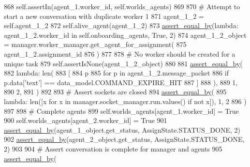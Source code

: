 \begin{DoxyCode}
868         self.assertIn(agent\_1.worker\_id, self.worlds\_agents)
869 
870         \textcolor{comment}{# Attempt to start a new conversation with duplicate worker 1}
871         agent\_1\_2 = self.agent\_1\_2
872         self.alive\_agent(agent\_1\_2)
873         \hyperlink{namespaceparlai_1_1mturk_1_1core_1_1test_1_1test__full__system_a0b463246d35658a2e422010f13dcf819}{assert\_equal\_by}(\textcolor{keyword}{lambda}: agent\_1\_2.worker\_id \textcolor{keywordflow}{in} self.onboarding\_agents, \textcolor{keyword}{True}, 2)
874         agent\_1\_2\_object = manager.worker\_manager.get\_agent\_for\_assignment(
875             agent\_1\_2.assignment\_id
876         )
877 
878         \textcolor{comment}{# No worker should be created for a unique task}
879         self.assertIsNone(agent\_1\_2\_object)
880 
881         \hyperlink{namespaceparlai_1_1mturk_1_1core_1_1test_1_1test__full__system_a0b463246d35658a2e422010f13dcf819}{assert\_equal\_by}(
882             \textcolor{keyword}{lambda}: len(
883                 [
884                     p
885                     \textcolor{keywordflow}{for} p \textcolor{keywordflow}{in} agent\_1\_2.message\_packet
886                     \textcolor{keywordflow}{if} p.data[\textcolor{stringliteral}{'text'}] == data\_model.COMMAND\_EXPIRE\_HIT
887                 ]
888             ),
889             1,
890             2,
891         )
892 
893         \textcolor{comment}{# Assert sockets are closed}
894         \hyperlink{namespaceparlai_1_1mturk_1_1core_1_1test_1_1test__full__system_a0b463246d35658a2e422010f13dcf819}{assert\_equal\_by}(
895             \textcolor{keyword}{lambda}: len([x \textcolor{keywordflow}{for} x \textcolor{keywordflow}{in} manager.socket\_manager.run.values() \textcolor{keywordflow}{if} \textcolor{keywordflow}{not} x]), 1, 2
896         )
897 
898         \textcolor{comment}{# Complete agents}
899         self.worlds\_agents[agent\_1.worker\_id] = \textcolor{keyword}{True}
900         self.worlds\_agents[agent\_2.worker\_id] = \textcolor{keyword}{True}
901         \hyperlink{namespaceparlai_1_1mturk_1_1core_1_1test_1_1test__full__system_a0b463246d35658a2e422010f13dcf819}{assert\_equal\_by}(agent\_1\_object.get\_status, AssignState.STATUS\_DONE, 2)
902         \hyperlink{namespaceparlai_1_1mturk_1_1core_1_1test_1_1test__full__system_a0b463246d35658a2e422010f13dcf819}{assert\_equal\_by}(agent\_2\_object.get\_status, AssignState.STATUS\_DONE, 2)
903 
904         \textcolor{comment}{# Assert conversation is complete for manager and agents}
905         \hyperlink{namespaceparlai_1_1mturk_1_1core_1_1test_1_1test__full__system_a0b463246d35658a2e422010f13dcf819}{assert\_equal\_by}(

\end{DoxyCode}
